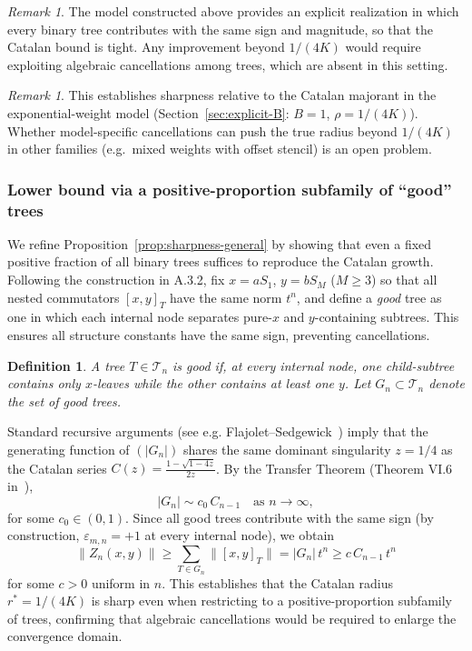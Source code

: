 \documentclass[11pt]{amsart}
\numberwithin{equation}{section}
\newtheorem{dfn}[theorem]{Definition}
\theoremstyle{remark}
\newtheorem{remark}[theorem]{Remark}
\begin{document}
\begin{remark}
The model constructed above provides an explicit realization
in which every binary tree contributes with the same sign and magnitude,
so that the Catalan bound is tight.
Any improvement beyond $1/(4K)$ would require exploiting algebraic
cancellations among trees, which are absent in this setting.
\end{remark}

\begin{remark}
This establishes sharpness relative to the Catalan majorant in the exponential-weight model
(Section~\ref{sec:explicit-B}: $B=1$, $\rho=1/(4K)$). Whether model-specific cancellations can push the true radius
beyond $1/(4K)$ in other families (e.g.\ mixed weights with offset stencil) is an open problem.
\end{remark}
\subsubsection{ Lower bound via a positive-proportion subfamily of ``good'' trees}

We refine Proposition~\ref{prop:sharpness-general} by showing that even a 
fixed positive fraction of all binary trees suffices to reproduce the 
Catalan growth. Following the construction in A.3.2, fix $x = aS_1$, 
$y = bS_M$ ($M\geq3$) so that all nested commutators $[x,y]_T$ have the 
same norm $t^n$, and define a \emph{good} tree as one in which each 
internal node separates pure-$x$ and $y$-containing subtrees. This ensures 
all structure constants have the same sign, preventing cancellations.

\begin{dfn}
A tree $T \in \mathcal{T}_n$ is \emph{good} if, at every internal node, 
one child-subtree contains only $x$-leaves while the other contains at 
least one $y$. Let $G_n \subset \mathcal{T}_n$ denote the set of good trees.
\end{dfn}

Standard recursive arguments (see e.g. Flajolet--Sedgewick~\cite{FlajoletSedgewick2009}) 
imply that the generating function of $(|G_n|)$ shares the same dominant 
singularity $z = 1/4$ as the Catalan series $C(z) = \frac{1-\sqrt{1-4z}}{2z}$. 
By the Transfer Theorem (Theorem VI.6 in~\cite{FlajoletSedgewick2009}), 
\[
|G_n| \sim c_0\, C_{n-1} \quad\text{as } n\to\infty,
\]
for some $c_0 \in (0,1)$. Since all good trees contribute with the same 
sign (by construction, $\varepsilon_{m,n} = +1$ at every internal node), 
we obtain
\[
\|Z_n(x,y)\| \geq \sum_{T \in G_n} \|[x,y]_T\| = |G_n|\, t^n 
\geq c\, C_{n-1}\, t^n
\]
for some $c > 0$ uniform in $n$. This establishes that the Catalan radius 
$r^* = 1/(4K)$ is sharp even when restricting to a positive-proportion 
subfamily of trees, confirming that algebraic cancellations would be 
required to enlarge the convergence domain.
\end{document}
